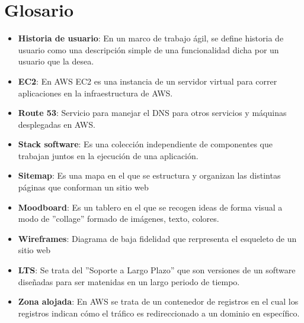 \chapter*{Glosario}

\begin{itemize}
    \item \textbf{Historia de usuario}: En un marco de trabajo ágil, se define historia de usuario como una descripción simple de una funcionalidad dicha por un usuario que la desea. 
    \item \textbf{EC2}: En AWS EC2 es una instancia de un servidor virtual para correr aplicaciones en la infraestructura de AWS.
    \item \textbf{Route 53}: Servicio para manejar el DNS para otros servicios y máquinas desplegadas en AWS.
    \item \textbf{Stack software}: Es una colección independiente de componentes que trabajan juntos en la ejecución de una aplicación.
    \item \textbf{Sitemap}: Es una mapa en el que se estructura y organizan las distintas páginas que conforman un sitio web
    \item \textbf{Moodboard}: Es un tablero en el que se recogen ideas de forma visual a modo de ''collage'' formado de imágenes, texto, colores.
    \item \textbf{Wireframes}: Diagrama de baja fidelidad que rerpresenta el esqueleto de un sitio web
    \item \textbf{LTS}: Se trata del ''Soporte a Largo Plazo'' que son versiones de un software diseñadas para ser matenidas en un largo periodo de tiempo.
    \item \textbf{Zona alojada}: En AWS se trata de un contenedor de registros en el cual los registros indican cómo el tráfico es redireccionado a un dominio en específico.
\end{itemize}